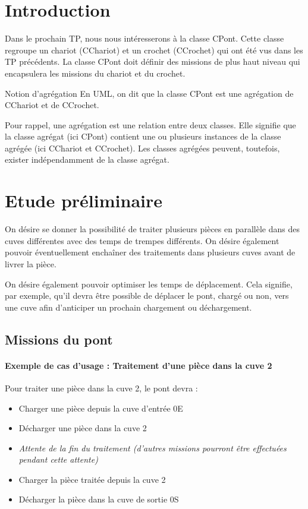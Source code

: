 \documentclass[TP, noCustomPackages]{UPSTI_Document}
\begin{document}
\section{Introduction}

Dans le prochain TP, nous nous intéresserons à la classe CPont. Cette classe regroupe un chariot (CChariot) et un crochet (CCrochet) qui ont été vus dans les TP précédents. La classe CPont doit définir des missions de plus haut niveau qui encapsulera les missions du chariot et du crochet.


\begin{UPSTIinfor}{Notion d'agrégation}
    En UML, on dit que la classe CPont est une agrégation de CChariot et de CCrochet. 

    Pour rappel, une agrégation est une relation entre deux classes. Elle signifie que la classe agrégat (ici CPont) contient une ou plusieurs instances de la classe agrégée (ici CChariot et CCrochet). Les classes agrégées peuvent, toutefois, exister indépendamment de la classe agrégat.
\end{UPSTIinfor}


\section{Etude préliminaire}
On désire se donner la possibilité de traiter plusieurs pièces en parallèle dans des cuves différentes avec des temps de trempes différents. On désire également pouvoir éventuellement enchaîner des traitements dans plusieurs cuves avant de livrer la pièce. 

On désire également pouvoir optimiser les temps de déplacement. Cela signifie, par exemple, qu'il devra être possible de déplacer le pont, chargé ou non, vers une cuve afin d'anticiper un prochain chargement ou déchargement. 

\subsection{Missions du pont}
\paragraph{Exemple de cas d'usage : Traitement d'une pièce dans la cuve 2}
Pour traiter une pièce dans la cuve 2, le pont devra :
\begin{itemize}
    \item Charger une pièce depuis la cuve d'entrée 0E
    \item Décharger une pièce dans la cuve 2
    \item \textit{Attente de la fin du traitement (d'autres missions pourront être effectuées pendant cette attente)}
    \item Charger la pièce traitée depuis la cuve 2
    \item Décharger la pièce dans la cuve de sortie 0S
\end{itemize}
\end{document}
